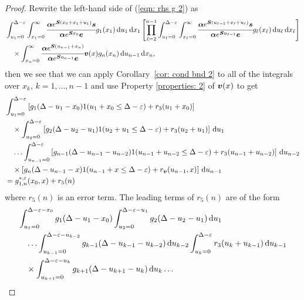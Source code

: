\begin{proof}
	Rewrite the left-hand side of (\ref{eqn: rhs g 2}) as 
	\begin{align*}
		& \int_{u_1=0}^{\Delta-\varepsilon} \int_{x_1=0}^\infty \cfrac{\boldsymbol \alpha e^{\boldsymbol{S}(x_{0}+x_1+u_1)}\boldsymbol s}{\boldsymbol \alpha e^{\boldsymbol{S}x_0}\boldsymbol e}g_1(x_1) \, \mathrm{d} u_1\, \mathrm{d} x_1 \nonumber 
		\left[\prod_{\ell=2}^{n-1}\int_{u_\ell=0}^{\Delta-\varepsilon} \int_{x_\ell=0}^\infty \cfrac{\boldsymbol \alpha e^{\boldsymbol{S}(u_{\ell-1}+x_\ell+u_\ell)}\boldsymbol s}{\boldsymbol \alpha e^{\boldsymbol{S}u_{\ell-1}}\boldsymbol e}g_\ell(x_\ell) \, \mathrm{d} u_\ell\, \mathrm{d} x_\ell \right]
            	\\&{}\quad\times\int_{x_n=0}^\infty \cfrac{\boldsymbol \alpha e^{\boldsymbol{S}(u_{n-1}+x_n )}}{\boldsymbol \alpha e^{\boldsymbol{S}u_{n-1}}\boldsymbol e} {\boldsymbol v}(x)g_{n}(x_n)\, \mathrm{d} u_{n-1} \, \mathrm{d} x_n,
	\end{align*}
	then we see that we can apply Corollary~\ref{cor: cond bnd 2} to all of the integrals over \(x_k,\, k=1,\dots,n-1\) and use Property \ref{properties: 2} of \({\boldsymbol v}(x)\) to get  
	\begin{align*}
		& \int_{u_1=0}^{\Delta-\varepsilon}\left[g_1(\Delta - u_1 - x_0)1(u_1 + x_0\leq \Delta - \varepsilon) + r_3 (u_1 + x_0)\right]
		\\&\quad\times\int_{u_2=0}^{\Delta-\varepsilon}\left[g_2(\Delta - u_2 - u_1)1(u_2 + u_1\leq \Delta - \varepsilon) + r_3 (u_2 + u_1)\right]\, \mathrm{d} u_1
		\\&\quad\hdots 
            	 \int_{u_{n-1}=0}^{\Delta-\varepsilon}  \left[g_{n-1}(\Delta - u_{n-1} - u_{n-2}) 1(u_{n-1} + u_{n-2}\leq \Delta - \varepsilon) +   r_3 (u_{n-1} + u_{n-2})\right] \, \mathrm{d} u_{n-2}
            	\\&\quad\times\left[g_{n}(\Delta-u_{n-1}-x)1(u_{n-1}+x\leq \Delta - \varepsilon) + r_{\boldsymbol v} (u_{n-1},x)\right]\, \mathrm{d} u_{n-1}
		\\&=g^{*,\varepsilon}_{1,n}(x_0,x) + r_5(n)
	\end{align*}
	where \(r_5(n)\) is an error term. The leading terms of \(r_5(n)\) are of the form 
	\begin{align*}
		&\int_{u_1=0}^{\Delta-\varepsilon-x_0}g_1(\Delta - u_1 - x_0)
		\int_{u_2=0}^{\Delta-\varepsilon-u_1}g_2(\Delta - u_2 - u_1)\wrt u_1
		\\&\quad\hdots\int_{u_{k-1}=0}^{\Delta-\varepsilon-u_{k-2}}g_{k-1}(\Delta - u_{k-1} - u_{k-2}) \wrt u_{k-2}
		\int_{u_k=0}^{\Delta-\varepsilon}r_3(u_{k}+u_{k-1}) \wrt u_{k-1}
		\\&\quad\times\int_{u_{k+1}=0}^{\Delta-\varepsilon-u_{k}}g_{k+1}(\Delta - u_{k+1} - u_{k}) \wrt u_{k}
		\hdots

\end{align*}
\end{proof}

